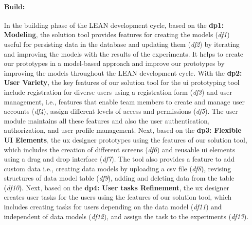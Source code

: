 \paragraph{Build:}
In the building phase of the LEAN development cycle, based on the \textbf{\ac{dp}1: Modeling}, the solution tool provides features for creating the models (\textit{\ac{df}1}) useful for persisting data in the database and updating them (\textit{\ac{df}2}) by iterating and improving the models with the results of the experiments.
It helps to create our prototypes in a model-based approach and improve our prototypes by improving the models throughout the LEAN development cycle.
With the \textbf{\ac{dp}2: User Variety}, the key features of our solution tool for the \ac{ui} prototyping tool include registration for diverse users using a registration form (\textit{\ac{df}3}) and user management, i.e., features that enable team members to create and manage user accounts (\textit{\ac{df}4}), assign different levels of access and permissions (\textit{\ac{df}5}).
The user module maintains all these features and also the user authentication, authorization, and user profile management.
Next, based on the \textbf{\ac{dp}3: Flexible UI Elements}, the \ac{ux} designer prototypes using the features of our solution tool, which includes the creation of different screens (\textit{\ac{df}6}) and reusable \ac{ui} elements using a drag and drop interface (\textit{\ac{df}7}). 
The tool also provides a feature to add custom data i.e., creating data models by uploading a \ac{csv} file (\textit{\ac{df}8}), revising structures of data model table (\textit{\ac{df}9}), adding and deleting data from the table (\textit{\ac{df}10}).
Next, based on the \textbf{\ac{dp}4: User tasks Refinement}, the \ac{ux} designer creates user tasks for the users using the features of our solution tool, which includes creating tasks for users depending on the data model (\textit{\ac{df}11}) and independent of data models (\textit{\ac{df}12}), and assign the task to the experiments (\textit{\ac{df}13}).

